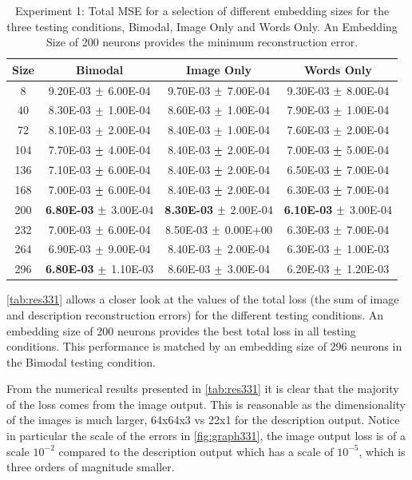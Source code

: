 \begin{table}[h]
\centering
	\begin{tabular}{|c|c|c|c|}
	\hline
	Size & 	Bimodal & 	Image Only 	& 	Words Only \\ \hline
8	&	9.20E-03	$\mypm$	6.00E-04	&	9.70E-03	$\mypm$	7.00E-04	&	9.30E-03	$\mypm$	8.00E-04	\\ \hline
40	&	8.30E-03	$\mypm$	1.00E-04	&	8.60E-03	$\mypm$	1.00E-04	&	7.90E-03	$\mypm$	1.00E-04	\\ \hline
72	&	8.10E-03	$\mypm$	2.00E-04	&	8.40E-03	$\mypm$	1.00E-04	&	7.60E-03	$\mypm$	2.00E-04	\\ \hline
104	&	7.70E-03	$\mypm$	4.00E-04	&	8.40E-03	$\mypm$	2.00E-04	&	7.00E-03	$\mypm$	5.00E-04	\\ \hline
136	&	7.10E-03	$\mypm$	6.00E-04	&	8.40E-03	$\mypm$	2.00E-04	&	6.50E-03	$\mypm$	7.00E-04	\\ \hline
168	&	7.00E-03	$\mypm$	6.00E-04	&	8.40E-03	$\mypm$	2.00E-04	&	6.30E-03	$\mypm$	7.00E-04	\\ \hline
200	&	\textbf{6.80E-03}	$\mypm$	3.00E-04	&	\textbf{8.30E-03}	$\mypm$	2.00E-04	&	\textbf{6.10E-03}	$\mypm$	3.00E-04	\\ \hline
232	&	7.00E-03	$\mypm$	6.00E-04	&	8.50E-03	$\mypm$	0.00E+00	&	6.30E-03	$\mypm$	7.00E-04	\\ \hline
264	&	6.90E-03	$\mypm$	9.00E-04	&	8.40E-03	$\mypm$	2.00E-04	&	6.30E-03	$\mypm$	1.00E-03	\\ \hline
296	&	\textbf{6.80E-03}	$\mypm$	1.10E-03	&	8.60E-03	$\mypm$	3.00E-04	&	6.20E-03	$\mypm$	1.20E-03	\\ \hline


	\end{tabular}
\caption{Experiment 1: Total MSE for a selection of different embedding sizes for the three testing conditions, Bimodal, Image Only and Words Only. An Embedding Size of 200 neurons provides the minimum reconstruction error.}
\label{tab:res331}
\end{table}

\autoref{tab:res331} allows a closer look at the values of the total loss (the sum of image and description reconstruction errors) for the different testing conditions. An embedding size of 200 neurons provides the best total loss in all testing conditions. This performance is matched by an embedding size of 296 neurons in the Bimodal testing condition.


From the numerical results presented in \autoref{tab:res331} it is clear that the majority of the loss comes from the image output. This is reasonable as the dimensionality of the images is much larger, 64x64x3 vs 22x1 for the description  output. Notice in particular the scale of the errors in \autoref{fig:graph331}, the image output loss is of a scale $10^{-2}$ compared to the description output which has a scale of $10^{-5}$, which is three orders of magnitude smaller. 

